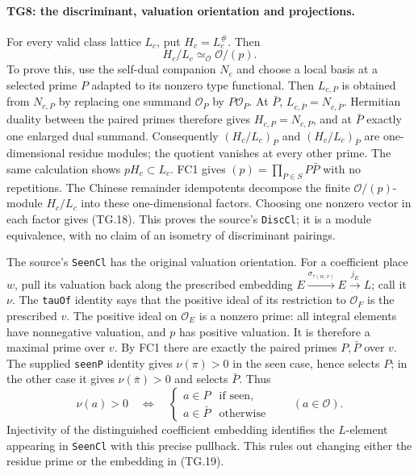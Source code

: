 \paragraph{TG8: the discriminant, valuation orientation and projections.}
For every valid class lattice $L_c$, put $H_c=L_c^{\#}$.
Then
\[
                     H_c/L_c\simeq_{\mathcal O}\mathcal O/(p).
 \tag{TG.18}
\]
To prove this, use the self-dual companion $N_c$ and choose a
local basis at a selected prime $P$ adapted to its nonzero type
functional. Then $L_{c,P}$ is obtained from $N_{c,P}$ by
replacing one summand $\mathcal O_P$ by $P\mathcal O_P$.
At $\bar P$, $L_{c,\bar P}=N_{c,\bar P}$. Hermitian duality
between the paired primes therefore gives
$H_{c,P}=N_{c,P}$, and at $\bar P$ exactly one enlarged dual
summand. Consequently $(H_c/L_c)_P$ and
$(H_c/L_c)_{\bar P}$ are one-dimensional residue modules;
the quotient vanishes at every other prime. The same calculation
shows $pH_c\subset L_c$. FC1 gives
$(p)=\prod_{P\in S}P\bar P$ with no repetitions. The Chinese
remainder idempotents decompose the finite $\mathcal O/(p)$-module
$H_c/L_c$ into these one-dimensional factors. Choosing one
nonzero vector in each factor gives (TG.18). This proves the
source's \texttt{DiscCl}; it is a module equivalence, with no
claim of an isometry of discriminant pairings.

The source's \texttt{SeenCl} has the original valuation
orientation. For a coefficient place $w$, pull its valuation back
along the prescribed embedding
$E\xrightarrow{\sigma_{\tau(w,v)}}E\xrightarrow{j_E}L$;
call it $\nu$. The \texttt{tauOf} identity says that the positive
ideal of its restriction to $\mathcal O_F$ is the prescribed
$v$. The positive ideal on $\mathcal O_E$ is a nonzero prime:
all integral elements have nonnegative valuation, and $p$ has
positive valuation. It is therefore a maximal prime over $v$.
By FC1 there are exactly the paired primes $P,\bar P$ over $v$.
The supplied \texttt{seenP} identity gives $\nu(\pi)>0$ in
the seen case, hence selects $P$; in the other case it gives
$\nu(\bar\pi)>0$ and selects $\bar P$. Thus
\[
 \nu(a)>0\quad\Longleftrightarrow\quad
 \begin{cases}a\in P&\text{if seen},\\a\in\bar P&\text{otherwise}
 \end{cases}\qquad(a\in\mathcal O).
 \tag{TG.19}
\]
Injectivity of the distinguished coefficient embedding identifies
the $L$-element appearing in \texttt{SeenCl} with this precise
pullback. This rules out changing either the residue prime or
the embedding in (TG.19).

